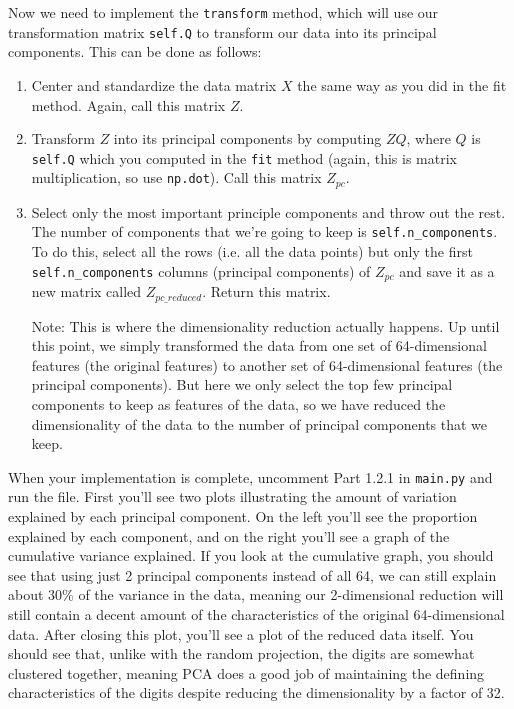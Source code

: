 \documentclass{article}
\begin{document}
Now we need to implement the \texttt{transform} method, which will use our transformation matrix \texttt{self.Q} to transform our data into its principal components. This can be done as follows:

\begin{enumerate}
    \item Center and standardize the data matrix $X$ the same way as you did in the fit method. Again, call this matrix $Z$.
    
    \item Transform $Z$ into its principal components by computing $ZQ$, where $Q$ is \texttt{self.Q} which you computed in the \texttt{fit} method (again, this is matrix multiplication, so use \texttt{np.dot}). Call this matrix $Z_{pc}$.
    
    \item Select only the most important principle components and throw out the rest. The number of components that we're going to keep is \texttt{self.n\_components}. To do this, select all the rows (i.e. all the data points) but only the first \texttt{self.n\_components} columns (principal components) of $Z_{pc}$ and save it as a new matrix called $Z_{pc\_reduced}$. Return this matrix.
    
    Note: This is where the dimensionality reduction actually happens. Up until this point, we simply transformed the data from one set of 64-dimensional features (the original features) to another set of 64-dimensional features (the principal components). But here we only select the top few principal components to keep as features of the data, so we have reduced the dimensionality of the data to the number of principal components that we keep.
\end{enumerate}

When your implementation is complete, uncomment Part 1.2.1 in \texttt{main.py} and run the file. First you'll see two plots illustrating the amount of variation explained by each principal component. On the left you'll see the proportion explained by each component, and on the right you'll see a graph of the cumulative variance explained. If you look at the cumulative graph, you should see that using just 2 principal components instead of all 64, we can still explain about 30\% of the variance in the data, meaning our 2-dimensional reduction will still contain a decent amount of the characteristics of the original 64-dimensional data. After closing this plot, you'll see a plot of the reduced data itself. You should see that, unlike with the random projection, the digits are somewhat clustered together, meaning PCA does a good job of maintaining the defining characteristics of the digits despite reducing the dimensionality by a factor of 32.
\end{document}
